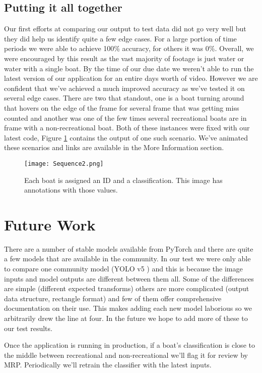 \documentclass[10pt,twocolumn,letterpaper]{article}
\begin{document}
\subsection{Putting it all together}

Our first efforts at comparing our output to test data did not go very well but they did help us identify quite a few edge cases. For a large portion of time periods we were able to achieve 100\% accuracy, for others it was 0\%. Overall, we were encouraged by this result as the vast majority of footage is just water or water with a single boat. By the time of our due date we weren't able to run the latest version of our application for an entire days worth of video. However we are confident that we've achieved a much improved accuracy as we've tested it on several edge cases. There are two that standout, one is a boat turning around that hovers on the edge of the frame for several frame that was getting miss counted and another was one of the few times several recreational boats are in frame with a non-recreational boat. Both of these instances were fixed with our latest code, Figure \ref{fig:sequence} contains the output of one such scenario. We've animated these scenarios and links are available in the More Information section. 

\begin{figure}
 \center
  \texttt{[image: Sequence2.png]}
  \caption{Each boat is assigned an ID and a classification. This image has annotations with those values.}
  \label{fig:sequence}
\end{figure}

\section{Future Work}

There are a number of stable models available from PyTorch and there are quite a few models that are available in the community. In our test we were only able to compare one community model (YOLO v5 \cite{pytorch_yolov5}) and this is because the image inputs and model outputs are different between them all. Some of the differences are simple (different expected transforms) others are more complicated (output data structure, rectangle format) and few of them offer comprehensive documentation on their use. This makes adding each new model laborious so we arbitrarily drew the line at four. In the future we hope to add more of these to our test results.

Once the application is running in production, if a boat's classification is close to the middle between recreational and non-recreational we'll flag it for review by MRP. Periodically we'll retrain the classifier with the latest inputs.
\end{document}
